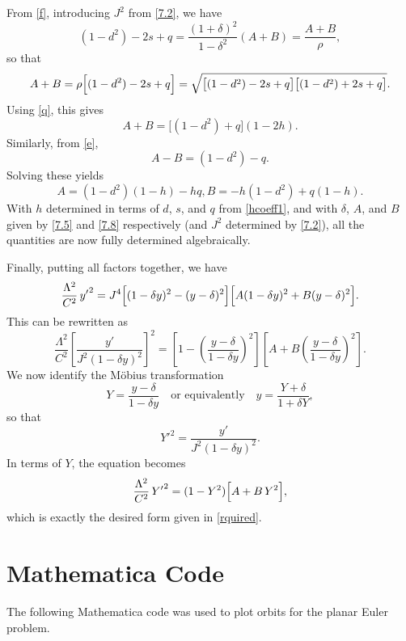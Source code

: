 \documentclass[12pt,oneside]{report}
\theoremstyle{definition}
\begin{document}
From \autoref{f}, introducing \(J^{2}\) from \autoref{7.2}, we have
\[
(1-d^{2})-2s+q = \frac{(1+\delta)^{2}}{1-\delta^{2}}(A+B)
= \frac{A+B}{\rho},
\]
so that
\[
A+B = \rho\Bigl[(1-d^{2})-2s+q\Bigr] = \sqrt{\bigl[(1-d^{2})-2s+q\bigr]\bigl[(1-d^{2})+2s+q\bigr]}.
\]
Using \autoref{q}, this gives
\[
A+B = \bigl[(1-d^{2})+q\bigr](1-2h).
\]
Similarly, from \autoref{e},
\[
A-B = (1-d^{2})-q.
\]
Solving these yields
\begin{subequations}
    \begin{equation}\label{7.8}
    A = (1-d^{2})(1-h) - hq,
    \end{equation}
    \begin{equation}
    B = -h(1-d^{2}) + q(1-h).
    \end{equation}
\end{subequations}
With \(h\) determined in terms of \(d\), \(s\), and \(q\) from \autoref{hcoeff1}, and with \(\delta\), \(A\), and \(B\) given by \autoref{7.5} and \autoref{7.8} respectively (and \(J^{2}\) determined by \autoref{7.2}), all the quantities are now fully determined algebraically.

\noindent Finally, putting all factors together, we have
\[
\frac{\Lambda^{2}}{C^{2}}\, {y'}^{2} = J^{4}\Bigl[(1-\delta y)^{2} - (y-\delta)^{2}\Bigr]
\Bigl[A(1-\delta y)^{2} + B(y-\delta)^{2}\Bigr].
\]
This can be rewritten as
\[
\frac{\Lambda^{2}}{C^{2}} \left[ \frac{y'}{J^{2}(1-\delta y)^{2}} \right]^{2} = \left[ 1- \left( \frac{y-\delta}{1-\delta y}\right)^{2}\right]
\left[A+B\left( \frac{y-\delta}{1-\delta y} \right)^{2}\right].
\]
We now identify the Möbius transformation
\begin{equation}
Y = \frac{y-\delta}{1-\delta y} \quad \text{or equivalently} \quad y = \frac{Y+\delta}{1+\delta Y},
\end{equation}
so that
\[
{Y'}^{2} = \frac{y'}{J^{2}(1-\delta y)^{2}}.
\]
In terms of \(Y\), the equation becomes
\[
\frac{\Lambda^{2}}{C^{2}}\, {Y'}^{2} = (1-Y^{2})\Bigl[A+B\,Y^{2}\Bigr],
\]
which is exactly the desired form given in \autoref{rquired}.
 

\chapter{Mathematica Code}\label{Mathematica code}

The following Mathematica code was used to plot orbits for the planar Euler problem.
\end{document}
